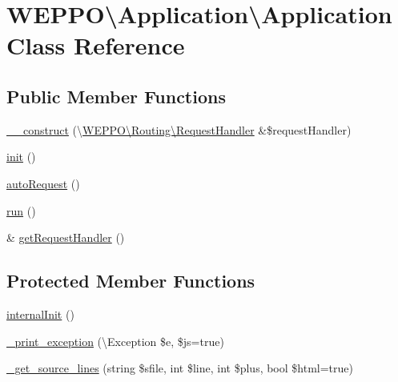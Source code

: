 \hypertarget{classWEPPO_1_1Application_1_1Application}{}\section{W\+E\+P\+PO\textbackslash{}Application\textbackslash{}Application Class Reference}
\label{classWEPPO_1_1Application_1_1Application}
\subsection*{Public Member Functions}
\begin{DoxyCompactItemize}
\item 
\hyperlink{classWEPPO_1_1Application_1_1Application_a2cd6c081f9605dda65b37a029423c704}{\+\_\+\+\_\+construct} (\textbackslash{}\hyperlink{classWEPPO_1_1Routing_1_1RequestHandler}{W\+E\+P\+P\+O\textbackslash{}\+Routing\textbackslash{}\+Request\+Handler} \&\$request\+Handler)
\item 
\hyperlink{classWEPPO_1_1Application_1_1Application_a1c329557d725b13597fe42d9d2c7ef9d}{init} ()
\item 
\hyperlink{classWEPPO_1_1Application_1_1Application_a1a0c0171a086ce9a74fdb58ab891a488}{auto\+Request} ()
\item 
\hyperlink{classWEPPO_1_1Application_1_1Application_a46df3113be7bf1f246c00a12dd9b1e3f}{run} ()
\item 
\& \hyperlink{classWEPPO_1_1Application_1_1Application_a94528e20d3434aafc6248a0854dac725}{get\+Request\+Handler} ()
\end{DoxyCompactItemize}
\subsection*{Protected Member Functions}
\begin{DoxyCompactItemize}
\item 
\hyperlink{classWEPPO_1_1Application_1_1Application_aa12cd49108ce93ec22bacefc8eea1ca6}{internal\+Init} ()
\item 
\hyperlink{classWEPPO_1_1Application_1_1Application_a72fc6bc6898fe1190fb08406d18ab35c}{\+\_\+print\+\_\+exception} (\textbackslash{}Exception \$e, \$js=true)
\item 
\hyperlink{classWEPPO_1_1Application_1_1Application_a7f2fef7292ea957391414a2c46b44e60}{\+\_\+get\+\_\+source\+\_\+lines} (string \$sfile, int \$line, int \$plus, bool \$html=true)
\end{DoxyCompactItemize}
